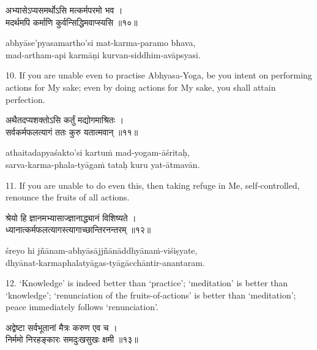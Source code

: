 \begin{gitaverse}
अभ्यासेऽप्यसमर्थोऽसि मत्कर्मपरमो भव । \\
मदर्थमपि कर्माणि कुर्वन्सिद्धिमवाप्स्यसि ॥१०॥
\end{gitaverse}

\begin{transliteration}
abhyāse'pyasamartho'si mat-karma-paramo bhava, \\
mad-artham-api karmāṇi kurvan-siddhim-avāpsyasi.
\end{transliteration}

10. If you are unable even to practise Abhyasa-Yoga, be you intent on
performing actions for My sake; even by doing actions for My sake, you shall
attain perfection.

\begin{gitaverse}
अथैतदप्यशक्तोऽसि कर्तुं मद्योगमाश्रितः । \\
सर्वकर्मफलत्यागं ततः कुरु यतात्मवान् ॥११॥
\end{gitaverse}

\begin{transliteration}
athaitadapyaśakto'si kartuṁ mad-yogam-āśritaḥ, \\
sarva-karma-phala-tyāgaṁ tataḥ kuru yat-ātmavān.
\end{transliteration}

11. If you are unable to do even this, then taking refuge in Me,
self-controlled, renounce the fruits of all actions.

\begin{gitaverse}
श्रेयो हि ज्ञानमभ्यासाज्ज्ञानाद्ध्यानं विशिष्यते । \\
ध्यानात्कर्मफलत्यागस्त्यागाच्छान्तिरनन्तरम् ॥१२॥
\end{gitaverse}

\begin{transliteration}
śreyo hi jñānam-abhyāsājjñānāddhyānaṁ-viśiṣyate, \\
dhyānat-karmaphalatyāgas-tyāgācchāntir-anantaram.
\end{transliteration}

12. `Knowledge' is indeed better than `practice'; `meditation' is better than
`knowledge'; `renunciation of the fruits-of-actions' is better than
`meditation'; peace immediately follows `renunciation'.

\begin{gitaverse}
अद्वेष्टा सर्वभूतानां मैत्रः करुण एव च । \\
निर्ममो निरहङ्कारः समदुःखसुखः क्षमी ॥१३॥
\end{gitaverse}

